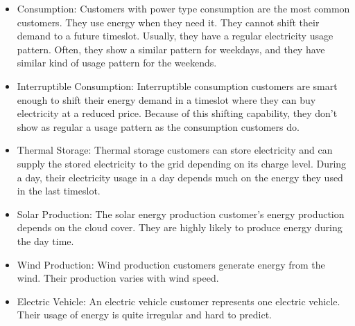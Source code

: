 \begin{itemize}
\item {Consumption: } Customers with power type consumption are the most common customers. They use energy when they need it. They cannot shift their demand to a future timeslot. Usually, they have a regular electricity usage pattern. Often, they show a similar pattern for weekdays, and they have similar kind of usage pattern for the weekends. 


\item {Interruptible Consumption: }
Interruptible consumption customers are smart enough to shift their energy demand in a timeslot where they can buy electricity at a reduced price. Because of this shifting capability, they don't show as regular a usage pattern as the consumption customers do. 

\item {Thermal Storage: }
Thermal storage customers can store electricity and can supply the stored electricity to the grid depending on its charge level. During a day, their electricity usage in a day depends  much on the energy they used in the last timeslot. 


\item {Solar Production: }
The solar energy production customer's energy production depends on the cloud cover. They are highly likely to produce energy during the day time.

\item {Wind Production: } Wind production customers generate energy from the wind. Their production varies with wind speed.
\item {Electric Vehicle: } An electric vehicle customer represents one electric vehicle. Their usage of energy is quite irregular and hard to predict. \\
\end{itemize}

